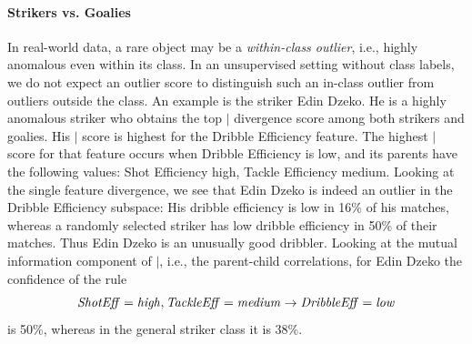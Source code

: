 \documentclass[conference]{IEEEtran}
\begin{document}
								\paragraph{Strikers vs. Goalies} 
								In real-world data, a rare object may be a {\em within-class outlier}, i.e., highly anomalous even within its class. In an unsupervised setting without class labels, we do not expect an outlier score to distinguish such an in-class outlier from outliers outside the class. 
								An example is the striker Edin Dzeko. He is a highly anomalous striker who obtains 
								the top $\mid$ divergence score among both strikers and goalies. His $\mid$ score is highest for the Dribble Efficiency feature. The highest $\mid$ score for that feature occurs when Dribble Efficiency is low, and its parents have the following values: Shot Efficiency high, Tackle Efficiency medium. Looking at the single feature divergence, 
								we see that Edin Dzeko is indeed an outlier in the Dribble Efficiency subspace: His dribble efficiency is low in 16\% of his matches, whereas a randomly selected striker has low dribble efficiency in 50\% of their matches. Thus Edin Dzeko is an unusually good dribbler. Looking at the mutual information component of $\mid$, i.e., the parent-child correlations, for Edin Dzeko the confidence of the rule 
								$$\it{ShotEff} = \it{high}, \it{TackleEff} = \it{medium}\rightarrow \it{DribbleEff} = \it{low}$$ is 50\%, whereas in the general striker class it is $38\%$.
								
\end{document}
